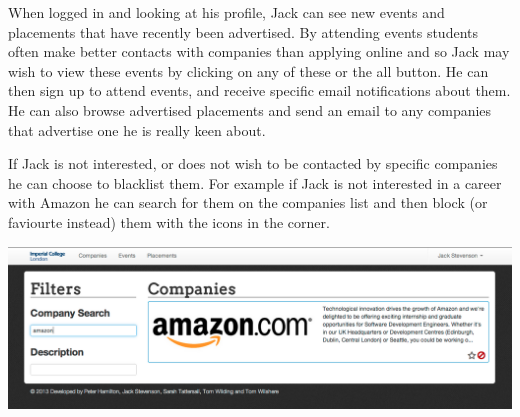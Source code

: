     When logged in and looking at his profile, Jack can see new events and placements that have recently been advertised. By attending events students often make better contacts with companies than applying online and so Jack may wish to view these events by clicking on any of these or the all button. He can then sign up to attend events, and receive specific email notifications about them.
    He can also browse advertised placements and send an email to any companies that advertise one he is really keen about.

    If Jack is not interested, or does not wish to be contacted by specific companies he can choose to blacklist them. For example if Jack is not interested in a career with Amazon he can search for them on the companies list and then block (or faviourte instead) them with the icons in the corner. 

    \includegraphics[scale=0.3]{images/user_experiences/student/block_amazon}


